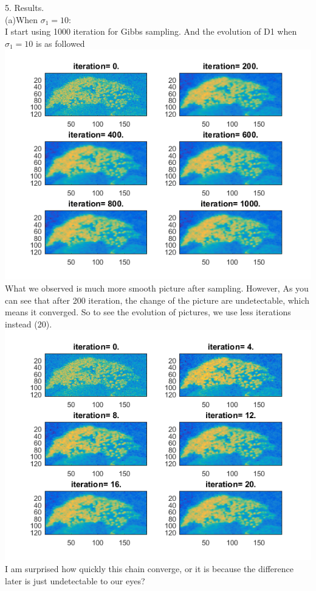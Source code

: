 \documentclass[11pt]{scrartcl}
\begin{document}
5. Results.\\
(a)When $\sigma_1=10$:\\
I start using 1000 iteration for Gibbs sampling. And the evolution of D1 when $\sigma_1=10$ is as followed\\
\includegraphics[scale=1]{D1_1000.png}\\
What we observed is much more smooth picture after sampling. However, As you can see that after 200 iteration, the change of the picture are undetectable, which means it converged. So to see the evolution of pictures, we use less iterations instead (20). \\
\includegraphics[scale=1]{D1_20.png}\\
I am surprised how quickly this chain converge, or it is because the difference later is just undetectable to our eyes?\\
\end{document}
